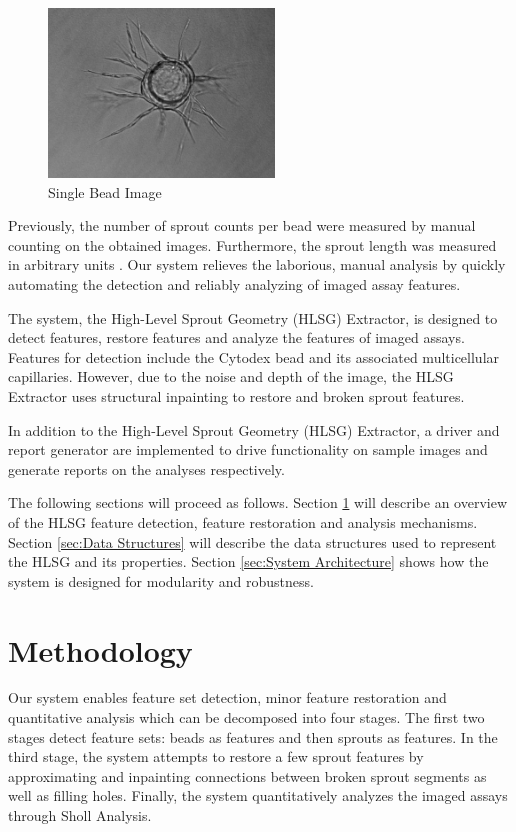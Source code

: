 \documentclass{sig-alternate}
\begin{document}
	\begin{figure}[ht]
		\centering
		\includegraphics[width=6cm]{images/mono.jpg}
		\caption{Single Bead Image}
		\label{fig:monobead}
	\end{figure}

	Previously, the number of sprout counts per bead were measured by manual
	counting on the obtained images. Furthermore, the sprout length was
	measured in arbitrary units \cite{nakatsu03}. Our system relieves the
	laborious, manual analysis by quickly automating the detection and reliably
	analyzing of imaged assay features.

	The system, the High-Level Sprout Geometry (HLSG) Extractor, is designed to
	detect features, restore features and analyze the features of imaged
	assays. Features for detection include the Cytodex bead and its associated
	multicellular capillaries. However, due to the noise and depth of the image,
	the HLSG Extractor uses structural inpainting to restore and broken sprout
	features.

	In addition to the High-Level Sprout Geometry (HLSG) Extractor, a driver
	and report generator are implemented to drive functionality on sample
	images and generate reports on the analyses respectively.

	The following sections will proceed as follows. Section
	\ref{sec:Methodology} will describe an overview of the HLSG feature
	detection, feature restoration and analysis mechanisms. Section
	\ref{sec:Data Structures} will describe the data structures used to
	represent the HLSG and its properties. Section \ref{sec:System
	Architecture} shows how the system is designed for modularity and
	robustness.

\section{Methodology} %
\label{sec:Methodology}
	Our system enables feature set detection, minor feature restoration and
	quantitative analysis which can be decomposed into four stages. The
	first two stages detect feature sets: beads as features and then
	sprouts as features. In the third stage, the system attempts to restore
	a few sprout features by approximating and inpainting connections between
	broken sprout segments as well as filling holes. Finally, the system
	quantitatively analyzes the imaged assays through Sholl Analysis.
\end{document}
